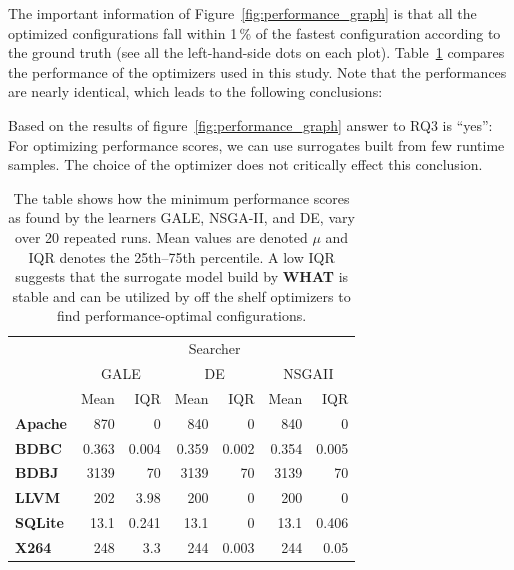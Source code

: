 \documentclass[smallextended]{svjour3}       %
\newcommand{\fig}[1]{Figure~\ref{fig:#1}}
\newcommand{\what}{{\bf WHAT}\xspace}
\begin{document}
The important information of \fig{performance_graph} is that all the optimized configurations fall within 1\,\% of the fastest
configuration according to the ground truth (see all the left-hand-side dots on each plot). Table~\ref{fig:external_validity} compares the performance of the optimizers
used in this study. Note that the performances are nearly identical, which leads to the following conclusions:

\begin{myshadowbox}
Based on the results of figure~\ref{fig:performance_graph} answer to RQ3 is ``yes'': For optimizing performance scores, we can use surrogates built from few runtime samples. The choice of the optimizer does not critically effect this conclusion.
\end{myshadowbox}


\begin{table}[tbh]
\centering
\caption{The table shows how the minimum performance scores as found by the learners GALE, NSGA-II, and DE, vary over 20 repeated
runs. Mean values are denoted $\mu$ and IQR denotes the 25th--75th percentile. A low IQR suggests that the surrogate model build by \what is stable and can be utilized by off the shelf optimizers to find performance-optimal configurations.
}
\label{fig:external_validity}
\vspace{2ex}
\begin{tabular}{lrrrrrr}
\toprule
\multirow{3}{*}{} & \multicolumn{6}{c}{Searcher}                                                                       \\ \cmidrule{2-7} 
                                  & \multicolumn{2}{c}{GALE} & \multicolumn{2}{c}{DE} & \multicolumn{2}{c}{NSGAII} \\ \cmidrule{2-7} 
                                  & Mean    & IQR    & Mean   & IQR   & Mean     & IQR     \\ \midrule
\textbf{Apache}                   & 870              & 0               & 840             & 0              & 840               & 0                \\ 
\textbf{BDBC}                     & 0.363            & 0.004           & 0.359           & 0.002          & 0.354             & 0.005            \\ 
\textbf{BDBJ}                     & 3139             & 70              & 3139            & 70             & 3139              & 70               \\ 
\textbf{LLVM}                     & 202              & 3.98            & 200             & 0              & 200               & 0                \\ 
\textbf{SQLite}                   & 13.1             & 0.241           & 13.1            & 0              & 13.1              & 0.406            \\ 
\textbf{X264}                     & 248              & 3.3             & 244             & 0.003          & 244               & 0.05             \\ \bottomrule
\end{tabular}
\end{table}
\end{document}
